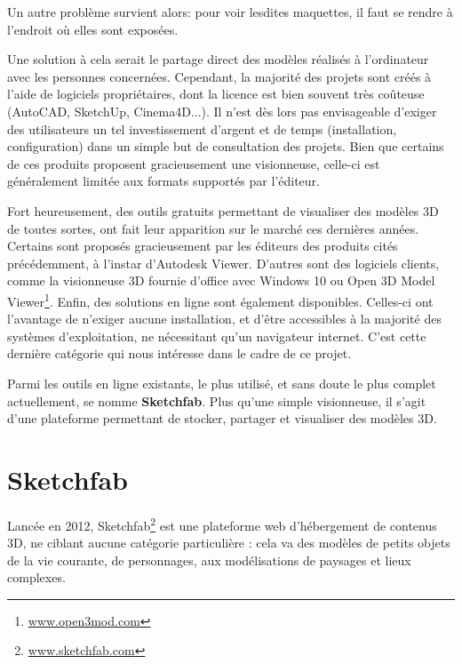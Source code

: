 Un autre problème survient alors: pour voir lesdites maquettes, il faut se rendre à l'endroit où elles sont exposées.

Une solution à cela serait le partage direct des modèles réalisés à l'ordinateur avec les personnes concernées. Cependant, la majorité des projets sont créés à l'aide de logiciels propriétaires, dont la licence est bien souvent très coûteuse (AutoCAD, SketchUp, Cinema4D...). Il n'est dès lors pas envisageable d'exiger des utilisateurs un tel investissement d'argent et de temps (installation, configuration) dans un simple but de consultation des projets.
Bien que certains de ces produits proposent gracieusement une visionneuse, celle-ci est généralement limitée aux formats supportés par l'éditeur.

Fort heureusement, des outils gratuits permettant de visualiser des modèles 3D de toutes sortes, ont fait leur apparition sur le marché ces dernières années. Certains sont proposés gracieusement par les éditeurs des produits cités précédemment, à l'instar d'Autodesk Viewer. D'autres sont des logiciels clients, comme la visionneuse 3D fournie d'office avec Windows 10 ou Open 3D Model Viewer\footnote{\url{www.open3mod.com}}. Enfin, des solutions en ligne sont également disponibles. Celles-ci ont l'avantage de n'exiger aucune installation, et d'être accessibles à la majorité des systèmes d'exploitation, ne nécessitant qu'un navigateur internet.
C'est cette dernière catégorie qui nous intéresse dans le cadre de ce projet.

Parmi les outils en ligne existants, le plus utilisé, et sans doute le plus complet actuellement, se nomme \textbf{Sketchfab}. Plus qu'une simple visionneuse, il s'agit d'une plateforme permettant de stocker, partager et visualiser des modèles 3D. 

\section{Sketchfab} \label{sketchfab}

Lancée en 2012, Sketchfab\footnote{\url{www.sketchfab.com}} est une plateforme web d'hébergement de contenus 3D, ne ciblant aucune catégorie particulière : cela va des modèles de petits objets de la vie courante, de personnages, aux modélisations de paysages et lieux complexes.

